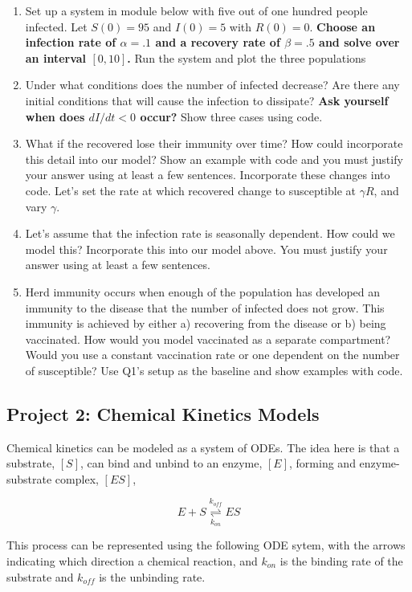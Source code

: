 \documentclass[12pt]{article}
\begin{document}
\begin{enumerate}
	\item Set up a system in module below with five out of one hundred people infected. Let $S(0)=95$ and $I(0)=5$ with $R(0)=0$. \textbf{Choose an infection rate of $\alpha=.1$ and a recovery rate of $\beta=.5$ and solve over an interval $[0,10]$.} Run the system and plot the three populations
	
	\item  Under what conditions does the number of infected decrease? Are there any initial conditions that will cause the infection to dissipate? \textbf{Ask yourself when does $dI/dt<0$ occur?} Show three cases using code.
	
	\item  What if the recovered lose their immunity over time? How could incorporate this detail into our model? Show an example with code and you must justify your answer using at least a few sentences. Incorporate these changes into code. Let's set the rate at which recovered change to susceptible at $\gamma R$, and vary $\gamma$.  

\item Let's assume that the infection rate is seasonally dependent. How could we model this? Incorporate this into our model above. You must justify your answer using at least a few sentences.

\item  Herd immunity occurs when enough of the population has developed an immunity to the disease that the number of infected does not grow. This immunity is achieved by either a) recovering from the disease or b) being vaccinated. How would you model vaccinated as a separate compartment? Would you use a constant vaccination rate or one dependent on the number of susceptible? Use Q1's setup as the baseline and show examples with code. 
\end{enumerate}

\subsection{Project 2: Chemical Kinetics Models}


Chemical kinetics can be modeled as a system of ODEs. The idea here is that a substrate, $[S]$, can bind and unbind to an enzyme, $[E]$, forming and enzyme-substrate complex, $[ES]$,

$$E+S\underset{k_{on}}{\stackrel{k_{off}}{\rightleftharpoons}}ES$$

This process can be represented using the following ODE sytem, with the arrows indicating which direction a chemical reaction, and $k_{on}$ is the binding rate of the substrate and $k_{off}$ is the unbinding rate.
\end{document}
